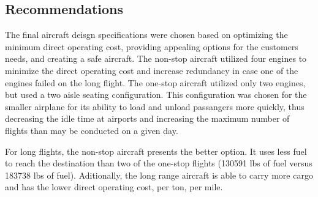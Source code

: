 \documentclass{article}
\begin{document}
    \subsection{Recommendations}
    \label{sec:Recommendations}
        \begin{flushleft}
            The final aircraft deisgn specifications were chosen based on
            optimizing the minimum direct operating cost, providing appealing
            options for the customers needs, and creating a safe aircraft. The
            non-stop aircraft utilized four engines to minimize the direct
            operating cost and increase redundancy in case one of the engines
            failed on the long flight. The one-stop aircraft utilized only two
            engines, but used a two aisle seating configuration. This
            configuration was chosen for the smaller airplane for its ability to
            load and unload passangers more quickly, thus decreasing the idle
            time at airports and increasing the maximum number of flights than
            may be conducted on a given day.

            For long flights, the non-stop aircraft presents the better option.
            It uses less fuel to reach the destination than two of the one-stop
            flights (130591 lbs of fuel versus 183738 lbs of fuel). Aditionally,
            the long range aircraft is able to carry more cargo and has the
            lower direct operating cost, per ton, per mile.
        \end{flushleft}
\end{document}
